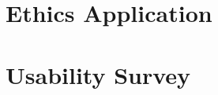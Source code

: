 \documentclass[12pt]{report}
\begin{document}
	\newpage
	
	\begin{appendix}
		\chapter{Ethics Application}{
			
			\label{app:Ethics}
		}
		\chapter{Usability Survey}{
			
			\label{app:Survey}
		}
	\end{appendix}
\end{document}
